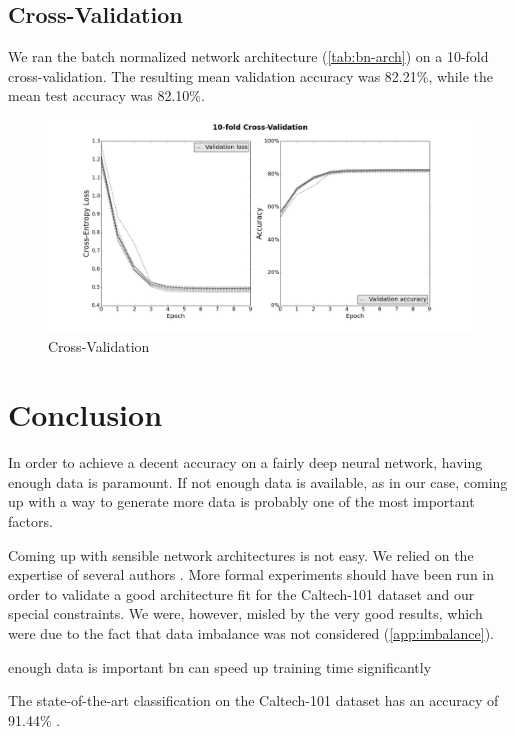\documentclass[a4paper, 11pt]{article}
\begin{document}
\clearpage

\subsection{Cross-Validation} \label{sec:cv}

We ran the batch normalized network architecture (\cref{tab:bn-arch}) on a 10-fold cross-validation.
The resulting mean validation accuracy was 82.21\%, while the mean test accuracy was 82.10\%.

\begin{figure}[H]
	\includegraphics[width=\linewidth]{cross-val.png}
	\caption{Cross-Validation}
	\label{fig:cross-val}
\end{figure}


\section{Conclusion}
In order to achieve a decent accuracy on a fairly deep neural network, having enough data is paramount.
If not enough data is available, as in our case, coming up with a way to generate more data is probably one of the most important factors.

Coming up with sensible network architectures is not easy.
We relied on the expertise of several authors \cite{Simonyan2015,CS231nCNN}.
More formal experiments should have been run in order to validate a good architecture fit for the Caltech-101 dataset and our special constraints.
We were, however, misled by the very good results, which were due to the fact that data imbalance was not considered (\cref{app:imbalance}).


enough data is important
bn can speed up training time significantly

The state-of-the-art classification on the Caltech-101 dataset has an accuracy of 91.44\% \cite{He2014}.
\end{document}
